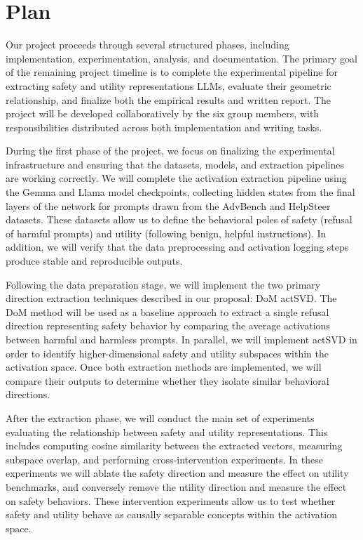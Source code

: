 \section{Plan}

Our project proceeds through several structured phases, including implementation, experimentation, analysis, and documentation. The primary goal of the remaining project timeline is to complete the experimental pipeline for extracting safety and utility representations LLMs, evaluate their geometric relationship, and finalize both the empirical results and written report. The project will be developed collaboratively by the six group members, with responsibilities distributed across both implementation and writing tasks.

During the first phase of the project, we focus on finalizing the experimental infrastructure and ensuring that the datasets, models, and extraction pipelines are working correctly. We will complete the activation extraction pipeline using the Gemma and Llama model checkpoints, collecting hidden states from the final layers of the network for prompts drawn from the AdvBench and HelpSteer datasets. These datasets allow us to define the behavioral poles of safety (refusal of harmful prompts) and utility (following benign, helpful instructions). In addition, we will verify that the data preprocessing and activation logging steps produce stable and reproducible outputs.

Following the data preparation stage, we will implement the two primary direction extraction techniques described in our proposal: DoM actSVD. The DoM method will be used as a baseline approach to extract a single refusal direction representing safety behavior by comparing the average activations between harmful and harmless prompts. In parallel, we will implement actSVD in order to identify higher-dimensional safety and utility subspaces within the activation space. Once both extraction methods are implemented, we will compare their outputs to determine whether they isolate similar behavioral directions.

After the extraction phase, we will conduct the main set of experiments evaluating the relationship between safety and utility representations. This includes computing cosine similarity between the extracted vectors, measuring subspace overlap, and performing cross-intervention experiments. In these experiments we will ablate the safety direction and measure the effect on utility benchmarks, and conversely remove the utility direction and measure the effect on safety behaviors. These intervention experiments allow us to test whether safety and utility behave as causally separable concepts within the activation space.

